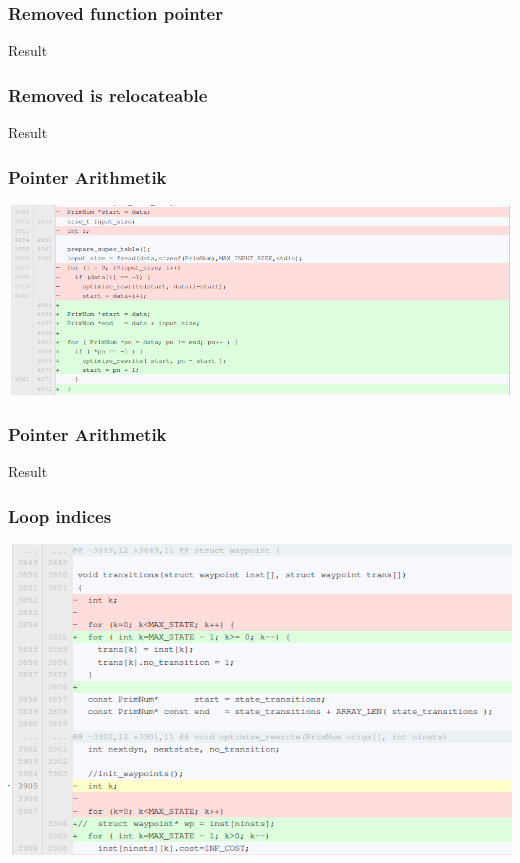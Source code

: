 \documentclass{beamer}
\begin{document}
\begin{frame}\frametitle{Removed function pointer}
\begin{center}
Result
\end{center}
\end{frame}

\begin{frame}\frametitle{Removed is relocateable}
\begin{center}
Result
\end{center}
\end{frame}

\begin{frame}\frametitle{Pointer Arithmetik}
\begin{center}
\includegraphics[scale=0.4]{shots/pointer_arith.png}
\end{center}
\end{frame}

\begin{frame}\frametitle{Pointer Arithmetik}
\begin{center}
Result
\end{center}
\end{frame}

\begin{frame}\frametitle{Loop indices}
\begin{center}
\includegraphics[scale=0.4]{shots/loop_indices.png}
\end{center}
\end{frame}
\end{document}
